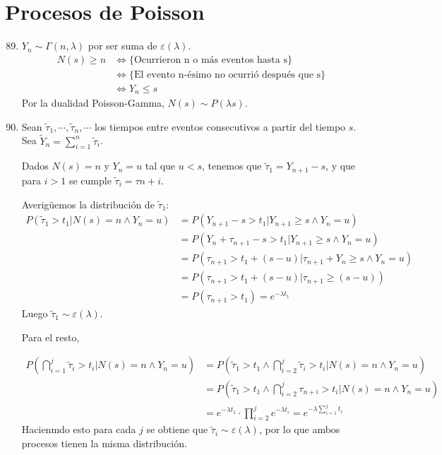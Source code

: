 \section{Procesos de Poisson}
\begin{enumerate}
	\setcounter{enumi}{88}
	\item
		$Y_n \sim \Gamma(n, \lambda)$ por ser suma de $\varepsilon(\lambda)$.
		\begin{align*}
			N(s) \geq n	& \Longleftrightarrow \{\text{Ocurrieron n o más eventos hasta s}\}			\\
						& \Longleftrightarrow \{\text{El evento n-ésimo no ocurrió después que s}\}	\\
						& \Longleftrightarrow Y_n \leq s
		\end{align*}
		Por la dualidad Poisson-Gamma, $N(s)\sim P(\lambda s)$.
	
	\item
		Sean $\tilde\tau_1, \cdots, \tilde\tau_n, \cdots$ los tiempos entre eventos consecutivos a partir del tiempo $s$. Sea $\tilde Y_n = \sum_{i=1}^n \tilde\tau_i$.
		
		Dados $N(s) = n$ y $Y_n = u$ tal que $u<s$, tenemos que $\tilde\tau_1 = Y_{n+1}-s$, y que para $i>1$ se cumple $\tilde\tau_i = \tau{n+i}$.
		
		Averigüemos la distribución de $\tilde\tau_1$:
		\begin{align*}
			P(\tilde\tau_1 > t_1 | N(s)=n \land Y_n = u)	& = P(Y_{n+1} - s > t_1 | Y_{n+1} \geq s \land Y_n = u)						\\
															& = P(Y_n + \tau_{n+1} - s > t_1 | Y_{n+1} \geq s \land Y_n = u)			\\
															& = P(\tau_{n+1} > t_1 + (s - u) | \tau_{n+1} + Y_n \geq s \land Y_n = u)	\\
															& = P(\tau_{n+1} > t_1 + (s - u) | \tau_{n+1} \geq (s - u))					\\
															& = P(\tau_{n+1} > t_1) = e^{-\lambda t_1}
		\end{align*}
		Luego $\tilde\tau_1 \sim \varepsilon(\lambda)$.
		
		Para el resto,
		
		\begin{align*}
			P\left(\bigcap_{i=1}^j \tilde\tau_i > t_i | N(s)=n \land Y_n = u\right)	& = P\left(\tilde\tau_1 > t_1 \land \bigcap_{i=2}^j \tilde\tau_i > t_i | N(s)=n \land Y_n = u\right)	\\
																					& = P\left(\tilde\tau_1 > t_1 \land \bigcap_{i=2}^j \tau_{n+i} > t_i | N(s)=n \land Y_n = u\right)		\\
																					& = e^{-\lambda t_1} \cdot \prod_{i=2}^j e^{-\lambda t_i} = e^{-\lambda \sum_{i=1}^j t_i}
		\end{align*}
		 Hacienmdo esto para cada $j$ se obtiene que $\tilde\tau_i \sim \varepsilon(\lambda)$, por lo que ambos procesos tienen la misma distribución.
		 

\end{enumerate}

